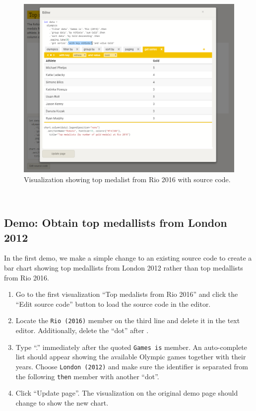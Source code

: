 \documentclass[a4paper,UKenglish]{lipics-v2016}
\theoremstyle{plain}
\theoremstyle{definition}
\begin{document}
\begin{figure}
\begin{center}
\includegraphics[scale=0.35,trim=0mm 0mm 0mm 0mm,clip]{images/af-editor.png}
\end{center}
\caption{Visualization showing top medalist from Rio 2016 with source code.}
\label{fig:code}
\end{figure}

~

\subsection{Demo: Obtain top medallists from London 2012}

In the first demo, we make a simple change to an existing source code to create a bar chart
showing top medallists from London 2012 rather than top medallists from Rio 2016.

\begin{enumerate}
\item Go to the first visualization ``Top medalists from Rio 2016'' and click the ``Edit source code''
  button to load the source code in the editor.
\item Locate the \texttt{Rio (2016)} member on the third line and delete it in the text editor.
  Additionally, delete the ``dot'' after .
\item Type ``.'' immediately after the quoted \texttt{Games is} member. An auto-complete list
  should appear showing the available Olympic games together with their years.
  Choose \texttt{London (2012)} and make sure the identifier is separated from the following
  \texttt{then} member with another ``dot''.
\item Click ``Update page''. The visualization on the original demo page should change to show
  the new chart.
\end{enumerate}
\end{document}
